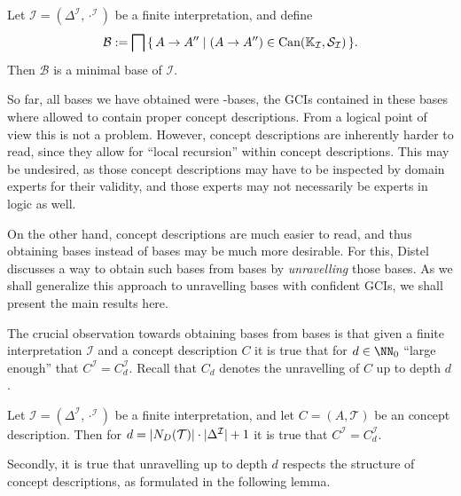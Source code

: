 \begin{Theorem}
  \label{thm:Felix-5.18}
  Let $\mathcal{I} = (\Delta^{\mathcal{I}}, \cdot^{\mathcal{I}})$ be a finite
  interpretation, and define
  \begin{equation*}
    \mathcal{B} := \bigsqcap {\ensuremath{\{\, A \to A'' \mid (A \to A'') \in \operatorname{Can}({\mathbb{K}}_{\mathcal{I}}, \mathcal{S}_{\mathcal{I}}) \,\}}}.
  \end{equation*}
  Then $\mathcal{B}$ is a minimal base of $\mathcal{I}$.
\end{Theorem}

So far, all bases we have obtained were \ELgfpbot-bases, \ie the GCIs contained in these
bases where allowed to contain proper \ELgfpbot concept descriptions.  From a logical
point of view this is not a problem.  However, \ELgfpbot concept descriptions are
inherently harder to read, since they allow for ``local recursion'' within concept
descriptions.  This may be undesired, as those concept descriptions may have to be
inspected by domain experts for their validity, and those experts may not necessarily be
experts in logic as well.

On the other hand, \ELbot concept descriptions are much easier to read, and thus obtaining
\ELbot bases instead of \ELgfpbot bases may be much more desirable.  For this, Distel
discusses a way to obtain such \ELbot bases from \ELgfpbot bases by \emph{unravelling}
those bases.  As we shall generalize this approach to unravelling \ELgfpbot bases with
confident GCIs, we shall present the main results here.

The crucial observation towards obtaining \ELbot bases from \ELgfpbot bases is that given
a finite interpretation $\mathcal{I}$ and a concept description $C$ it is true that for $d
\in \NN_0$ ``large enough'' that $C^{\mathcal{I}} = C_d^{\mathcal{I}}$.  Recall that $C_d$
denotes the unravelling of $C$ up to depth $d$.

\begin{Lemma}
  \label{lem:Felix-lemma-5.5}
  Let $\mathcal{I} = (\Delta^{\mathcal{I}}, \cdot^{\mathcal{I}})$ be a finite
  interpretation, and let $C = (A, \mathcal{T})$ be an \ELgfp concept description.
  Then for $d = \lvert N_D(\mathcal{T}) \rvert \cdot \lvert \Delta^{\mathcal{I}} \rvert + 1$ it is
  true that $C^{\mathcal{I}} = C_d^{\mathcal{I}}$.
\end{Lemma}

Secondly, it is true that unravelling up to depth $d$ respects the structure of \ELbot
concept descriptions, as formulated in the following lemma.

